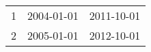 % 
\begin{tabular}{ccc}
  \hline
  \hline
1 & 2004-01-01 & 2011-10-01 \\ 
  2 & 2005-01-01 & 2012-10-01 \\ 
   \hline
\end{tabular}
